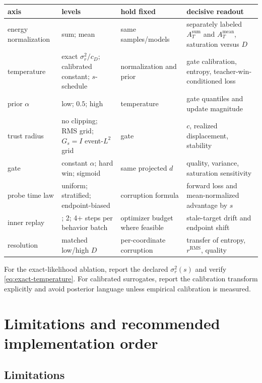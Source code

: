 \documentclass[11pt,a4paper]{article}
\newcommand{\RMS}{\operatorname{RMS}}
\theoremstyle{plain}
\theoremstyle{definition}
\begin{document}
\begin{center}
\small
\begin{tabular}{@{}
  >{\raggedright\arraybackslash}p{}
  >{\raggedright\arraybackslash}p{}
  >{\raggedright\arraybackslash}p{}
  >{\raggedright\arraybackslash}p{}@{}}
\toprule
axis & levels & hold fixed & decisive readout\\
\midrule
energy normalization & sum; mean & same samples/models & separately labeled
$A_T^{\mathrm{sum}}$ and $A_T^{\mathrm{mean}}$, saturation versus $D$\\
\addlinespace
temperature & exact $\sigma_r^2/c_D$; calibrated constant; $s$-schedule &
normalization and prior & gate calibration, entropy, teacher-win-conditioned loss\\
\addlinespace
prior $\alpha$ & low; $0.5$; high & temperature & gate quantiles and update magnitude\\
\addlinespace
trust radius & no clipping; RMS grid; $G_s=I$ event-$L^2$ grid & gate & $c$, realized displacement,
stability\\
\addlinespace
gate & constant $\alpha$; hard win; sigmoid & same projected $d$ & quality, variance,
saturation sensitivity\\
\addlinespace
probe time law & uniform; stratified; endpoint-biased & corruption formula & forward loss and
mean-normalized advantage by $s$\\
\addlinespace
inner replay & 1; 2; 4+ steps per behavior batch & optimizer budget where feasible & stale-target
drift and endpoint shift\\
\addlinespace
resolution & matched low/high $D$ & per-coordinate corruption & transfer of entropy,
$r^{\RMS}$, quality\\
\bottomrule
\end{tabular}
\end{center}

For the exact-likelihood ablation, report the declared $\sigma_r^2(s)$ and verify
\eqref{eq:exact-temperature}.  For calibrated surrogates, report the calibration transform
explicitly and avoid posterior language unless empirical calibration is measured.

\section{Limitations and recommended implementation order}
\label{sec:limitations}

\subsection{Limitations}
\end{document}
